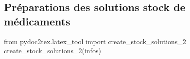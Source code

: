 \subsection{Préparations des solutions stock de médicaments}

\begin{pycode}
from pydoc2tex.latex_tool import create_stock_solutions_2
create_stock_solutions_2(infos)
\end{pycode}
